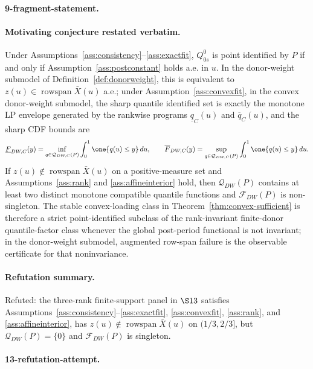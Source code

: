\paragraph{9-fragment-statement.}
\paragraph{Motivating conjecture restated verbatim.}
Under Assumptions~\ref{ass:consistency}--\ref{ass:exactfit}, \(Q^0_{0s}\) is point identified by \(P\) if and only if Assumption~\ref{ass:postconstant} holds a.e. in \(u\).  In the donor-weight submodel of Definition~\ref{def:donorweight}, this is equivalent to \(z(u)\in\operatorname{rowspan}\bar X(u)\) a.e.; under Assumption~\ref{ass:convexfit}, in the convex donor-weight submodel, the sharp quantile identified set is exactly the monotone LP envelope generated by the rankwise programs \(\underline q_C(u)\) and \(\overline q_C(u)\), and the sharp CDF bounds are
\[
\underline F_{DW,C}(y)=\inf_{q\in\mathcal{Q}_{DW,C}(P)}\int_0^1\one\{q(u)\le y\}\,du,\qquad
\overline F_{DW,C}(y)=\sup_{q\in\mathcal{Q}_{DW,C}(P)}\int_0^1\one\{q(u)\le y\}\,du.
\]
If \(z(u)\notin\operatorname{rowspan}\bar X(u)\) on a positive-measure set and Assumptions~\ref{ass:rank} and \ref{ass:affineinterior} hold, then \(\mathcal{Q}_{DW}(P)\) contains at least two distinct monotone compatible quantile functions and \(\mathcal{F}_{DW}(P)\) is non-singleton.  The stable convex-loading class in Theorem~\ref{thm:convex-sufficient} is therefore a strict point-identified subclass of the rank-invariant finite-donor quantile-factor class whenever the global post-period functional is not invariant; in the donor-weight submodel, augmented row-span failure is the observable certificate for that noninvariance.

\paragraph{Refutation summary.}
Refuted: the three-rank finite-support panel in \(\S13\) satisfies Assumptions~\ref{ass:consistency}--\ref{ass:exactfit}, \ref{ass:convexfit}, \ref{ass:rank}, and \ref{ass:affineinterior}, has \(z(u)\notin\operatorname{rowspan}\bar X(u)\) on \((1/3,2/3]\), but \(\mathcal{Q}_{DW}(P)=\{0\}\) and \(\mathcal{F}_{DW}(P)\) is singleton.

\paragraph{13-refutation-attempt.}
